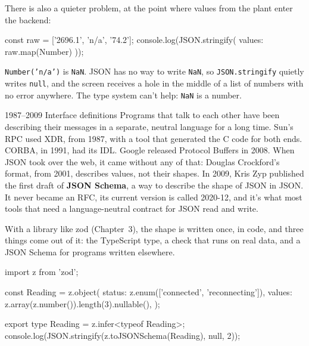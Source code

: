 There is also a quieter problem, at the point where values from the plant
enter the backend:

\begin{code}
const raw = ['2696.1', 'n/a', '74.2'];
console.log(JSON.stringify({ values: raw.map(Number) }));
\end{code}


\texttt{Number('n/a')} is \texttt{NaN}. JSON has no way to write \texttt{NaN},
so \texttt{JSON.stringify} quietly writes \texttt{null}, and the screen receives
a hole in the middle of a list of numbers with no error anywhere. The type
system can't help: \texttt{NaN} is a number.

\begin{history}{1987--2009 \textperiodcentered{} Interface definitions}
Programs that talk to each other have been describing their messages in a
separate, neutral language for a long time. Sun's RPC used XDR, from 1987, with
a tool that generated the C code for both ends. CORBA, in 1991, had its IDL.
Google released Protocol Buffers in 2008. When JSON took over the web, it came
without any of that: Douglas Crockford's format, from 2001, describes values,
not their shapes. In 2009, Kris Zyp published the first draft of
\textbf{JSON Schema}, a way to describe the shape of JSON in JSON. It never
became an RFC, its current version is called 2020-12, and it's what most tools
that need a language-neutral contract for JSON read and write.
\end{history}

With a library like zod (Chapter~3), the shape is written once, in code, and
three things come out of it: the TypeScript type, a check that runs on real
data, and a JSON Schema for programs written elsewhere.

\begin{code}
import { z } from 'zod';

const Reading = z.object({
  status: z.enum(['connected', 'reconnecting']),
  values: z.array(z.number()).length(3).nullable(),
});

export type Reading = z.infer<typeof Reading>;
console.log(JSON.stringify(z.toJSONSchema(Reading), null, 2));
\end{code}


